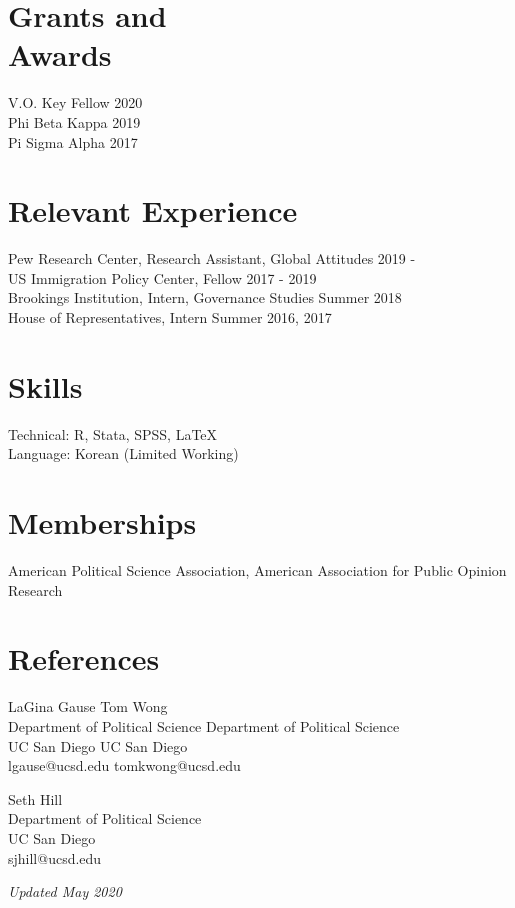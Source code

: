 \documentclass[margin, line]{res}
\begin{document}
\begin{resume}
\section{Grants and \\Awards}  
V.O. Key Fellow \hfill 2020\\
Phi Beta Kappa \hfill 2019\\
Pi Sigma Alpha \hfill 2017

\section{Relevant Experience}
Pew Research Center, Research Assistant, Global Attitudes \hfill 2019 - \\
US Immigration Policy Center, Fellow \hfill 2017 - 2019\\
Brookings Institution, Intern, Governance Studies \hfill Summer 2018\\
House of Representatives, Intern \hfill Summer 2016, 2017
	
\section{Skills} 
Technical: R, Stata, SPSS, \LaTeX\\
Language: Korean (Limited Working)

\section{Memberships}
American Political Science Association, American Association for Public Opinion Research

\section{References} LaGina Gause \hfill Tom Wong\\
Department of Political Science \hfill Department of Political Science\\
UC San Diego \hfill UC San Diego\\
lgause@ucsd.edu \hfill tomkwong@ucsd.edu

Seth Hill\\
Department of Political Science\\
UC San Diego\\
sjhill@ucsd.edu

\small{\textit{Updated May 2020}}

\end{resume}
\end{document}
